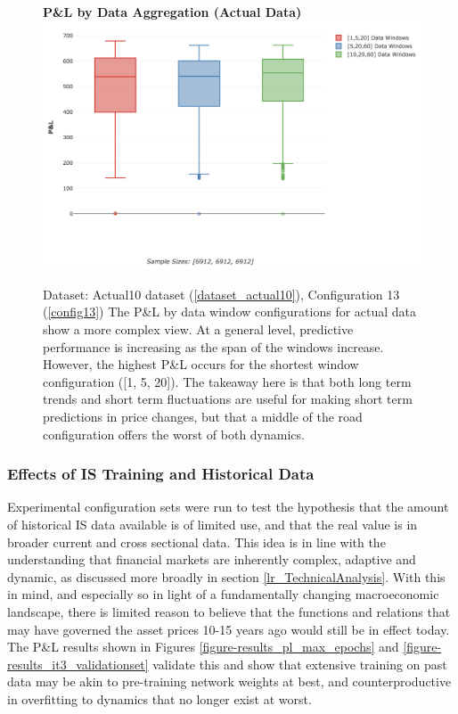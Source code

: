 \documentclass[a4paper,11pt,oneside]{article}
\theoremstyle{plain}
\theoremstyle{definition}
\begin{document}
\begin{figure}[H]
	\centering 
	\textbf{P\&L by Data Aggregation (Actual Data) }
	\includegraphics[scale=0.4]{images/results/data/actual_aggregation_pl.png}
	\caption[P\&L by Data Aggregation (Actual Data)]{
		Dataset: Actual10 dataset (\ref{dataset_actual10}), Configuration 13 (\ref{config13})
		\newline The P\&L by data window configurations for actual data show a more complex view. At a general level, predictive performance is increasing as the span of the windows increase. However, the highest P\&L occurs for the shortest window configuration ([1, 5, 20]). The takeaway here is that both long term trends and short term fluctuations are useful for making short term predictions in price changes, but that a middle of the road configuration offers the worst of both dynamics.}
	\label{figure-actual_aggregation_pl}
\end{figure}

\subsubsection{Effects of IS Training and Historical Data}\label{results_data_hist}

Experimental configuration sets were run to test the hypothesis that the amount of historical IS data available is of limited use, and that the real value is in broader current and cross sectional data. This idea is in line with the understanding that financial markets are inherently complex, adaptive and dynamic, as discussed more broadly in section \ref{lr_TechnicalAnalysis}. With this in mind, and especially so in light of a fundamentally changing macroeconomic landscape, there is limited reason to believe that the functions and relations that may have governed the asset prices 10-15 years ago would still be in effect today. The P\&L results shown in Figures \ref{figure-results_pl_max_epochs} and \ref{figure-results_it3_validationset} validate this and show that extensive training on past data may be akin to pre-training network weights at best, and counterproductive in overfitting to dynamics that no longer exist at worst.
\end{document}
